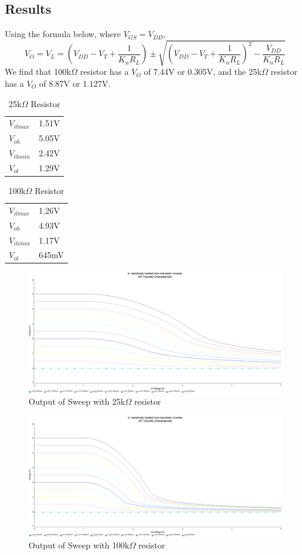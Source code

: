 \documentclass[12pt]{article}
\begin{document}
\subsection{Results}
Using the formula below, where $V_{GS}=V_{DD}$,
$$V_O=V_L=\left(V_{DD}-V_T+\frac{1}{K_nR_L}\right)\pm\sqrt{\left(V_{DD}-V_T+\frac{1}{K_nR_L}\right)^{2}-\frac{V_{DD}}{K_nR_L}}$$
We find that 100k$\Omega$ resistor has a $V_O$ of 7.44V or 0.305V, and the 25k$\Omega$ resistor has a $V_O$ of 8.87V or 1.127V.
\begin{table}[H]
\centering
\begin{tabular}{ll}
$V_{il max}$ & 1.51V \\
$V_{oh}$ & 5.05V \\
$V_{ih min}$ & 2.42V \\
$V_{ol}$ & 1.29V
\end{tabular}
\caption{25k$\Omega$ Resistor}
\end{table}

\begin{table}[H]
\centering
\begin{tabular}{ll}
$V_{il max}$ & 1.26V \\
$V_{oh}$ & 4.93V \\
$V_{ih min}$ & 1.17V \\
$V_{ol}$ & 645mV
\end{tabular}
\caption{100k$\Omega$ Resistor}
\end{table}

\begin{figure}[H]
\centering
\includegraphics[width=1\textwidth]{b6.PNG}
\caption{Output of Sweep with 25k$\Omega$ resistor}
\end{figure}

\begin{figure}[H]
\centering
\includegraphics[width=1\textwidth]{b7.PNG}
\caption{Output of Sweep with 100k$\Omega$ resistor}
\end{figure}
\end{document}
